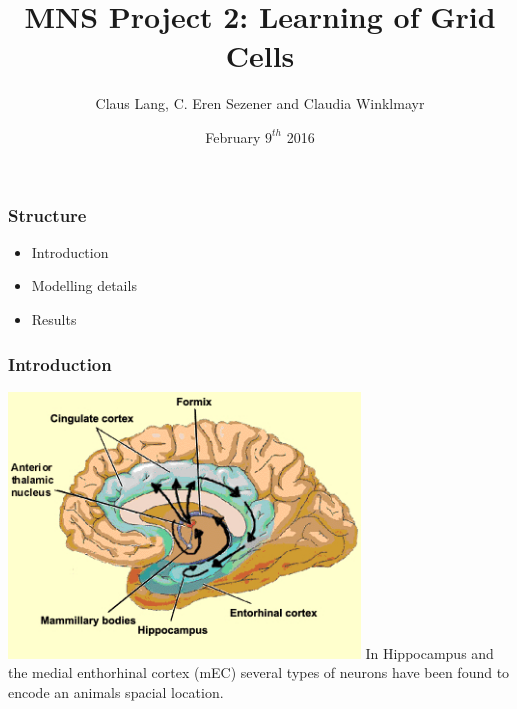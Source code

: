 \documentclass[mathserif]{beamer}
\title[MNS Project 2]{MNS Project 2: Learning of Grid Cells}
\author[C.Lang, C.E.Sezener, C.Winklmayr]{Claus Lang, C. Eren Sezener and Claudia Winklmayr}
\institute{BCCN}
\date[9.2.2016]{February $9^{th}$ 2016}
\begin{document}
\maketitle
%
%
%
\begin{frame}
\frametitle{Structure}
	\begin{itemize}
	\item Introduction\newline
	\item Modelling details\newline
	\item Results
	\end{itemize}
\end{frame}
%
%
%
\begin{frame}
\frametitle{Introduction}
\includegraphics[width=0.7\textwidth]{mEC.jpg}\newline
In Hippocampus and the medial enthorhinal cortex (mEC) several types of neurons have been found to encode an animals spacial location.  
\end{frame}
% 
%
%
\end{document}

